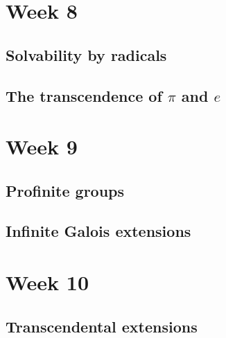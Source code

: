\documentclass[12pt]{report}
\theoremstyle{definition}
\begin{document}
\chapter*{Week 8}
\setcounter{chapter}{8}

\section{Solvability by radicals}

\section{The transcendence of $\pi$ and $e$}

\chapter*{Week 9}
\setcounter{chapter}{9}

\section{Profinite groups}

\section{Infinite Galois extensions}


\chapter*{Week 10}
\setcounter{chapter}{10}

\section{Transcendental extensions}




\end{document}
